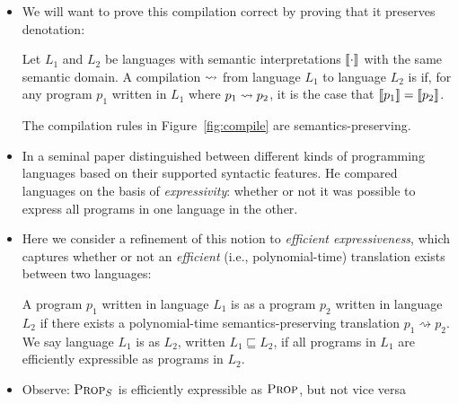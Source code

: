 \documentclass{tufte-handout}
\begin{document}
\begin{itemize}
  \item We will want to prove this compilation correct by proving that it preserves denotation:
  \begin{definition}
    Let $L_1$ and $L_2$ be languages with semantic interpretations $\left \llbracket {\cdot} \right \rrbracket$
    with the same semantic domain.
    A compilation $\rightsquigarrow$ from language $L_1$ to language $L_2$ is
     if, for any program $p_1$ written in $L_1$ 
    where $p_1 \rightsquigarrow p_2$, it is the case that $\left \llbracket {p_1} \right \rrbracket = \left \llbracket {p_2} \right \rrbracket$.
  \end{definition}
  \begin{theorem}
    The compilation rules in Figure~\ref{fig:compile} are semantics-preserving.
  \end{theorem}
  \item In a seminal paper \citet{felleisen1990expressive} distinguished between
  different kinds of programming languages based on their supported syntactic features. He
  compared languages on the basis of \emph{expressivity}: whether or not it was
  possible to express all programs in one language in the other. 
  \item Here we consider a refinement of this notion to \emph{efficient
  expressiveness}, which captures whether or not an \emph{efficient} (i.e., polynomial-time)
  translation exists between two languages:
  \begin{definition}
    A program $p_1$ written in language $L_1$ is  
    as a program $p_2$ written in language $L_2$ if
    there exists a polynomial-time semantics-preserving translation $p_1
    \rightsquigarrow p_2$. 
    We say language $L_1$ is  as $L_2$, written $L_1 \sqsubseteq L_2$, 
    if all programs in $L_1$ are efficiently expressible as programs in $L_2$.
  \end{definition}

  \item Observe: $\textsc{Prop}_S$ is efficiently expressible as $\textsc{Prop}$, but not vice versa




\end{itemize}
\end{document}
